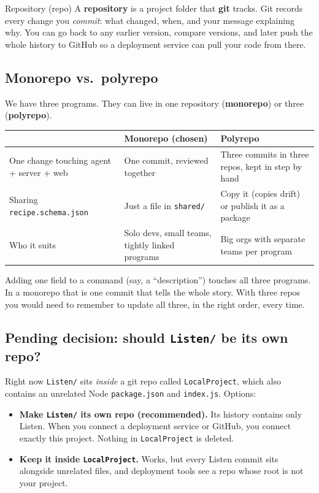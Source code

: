 \documentclass[11pt,a4paper]{article}
\begin{document}
\begin{concept}{Repository (repo)}
A \textbf{repository} is a project folder that \textbf{git} tracks. Git records every change
you \emph{commit}: what changed, when, and your message explaining why. You can go back to
any earlier version, compare versions, and later push the whole history to GitHub so a
deployment service can pull your code from there.
\end{concept}

\subsection{Monorepo vs.\ polyrepo}
We have three programs. They can live in one repository (\textbf{monorepo}) or three
(\textbf{polyrepo}).

\begin{center}
\renewcommand{\arraystretch}{1.25}
\begin{tabularx}{\textwidth}{l X X}
\toprule
 & \textbf{Monorepo (chosen)} & \textbf{Polyrepo} \\
\midrule
One change touching agent + server + web & One commit, reviewed together & Three commits in three repos, kept in step by hand \\
Sharing \texttt{recipe.schema.json} & Just a file in \texttt{shared/} & Copy it (copies drift) or publish it as a package \\
Who it suits & Solo devs, small teams, tightly linked programs & Big orgs with separate teams per program \\
\bottomrule
\end{tabularx}
\end{center}

\begin{why}
Adding one field to a command (say, a ``description'') touches all three programs. In a
monorepo that is one commit that tells the whole story. With three repos you would need to
remember to update all three, in the right order, every time.
\end{why}

\subsection{Pending decision: should \texttt{Listen/} be its own repo?}
Right now \texttt{Listen/} sits \emph{inside} a git repo called \texttt{LocalProject}, which
also contains an unrelated Node \texttt{package.json} and \texttt{index.js}. Options:
\begin{itemize}[nosep]
  \item \textbf{Make \texttt{Listen/} its own repo (recommended).} Its history contains only
        Listen. When you connect a deployment service or GitHub, you connect exactly this
        project. Nothing in \texttt{LocalProject} is deleted.
  \item \textbf{Keep it inside \texttt{LocalProject}.} Works, but every Listen commit sits
        alongside unrelated files, and deployment tools see a repo whose root is not your
        project.
\end{itemize}
\end{document}
